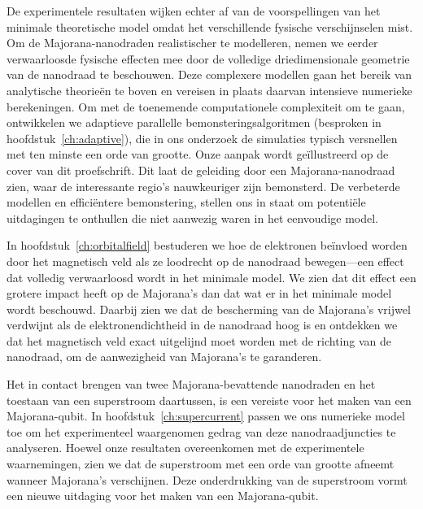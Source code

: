 {
De experimentele resultaten wijken echter af van de voorspellingen van het minimale theoretische model omdat het verschillende fysische verschijnselen mist.
Om de Majorana-nanodraden realistischer te modelleren, nemen we eerder verwaarloosde fysische effecten mee door de volledige driedimensionale geometrie van de nanodraad te beschouwen.
Deze complexere modellen gaan het bereik van analytische theorieën te boven en vereisen in plaats daarvan intensieve numerieke berekeningen.
Om met de toenemende computationele complexiteit om te gaan, ontwikkelen we adaptieve parallelle bemonsteringsalgoritmen (besproken in hoofdstuk~\ref{ch:adaptive}), die in ons onderzoek de simulaties typisch versnellen met ten minste een orde van grootte.
Onze aanpak wordt geïllustreerd op de cover van dit proefschrift.
Dit laat de geleiding door een Majorana-nanodraad zien, waar de interessante regio's nauwkeuriger zijn bemonsterd.  %
De verbeterde modellen en efficiëntere bemonstering, stellen ons in staat om potentiële uitdagingen te onthullen die niet aanwezig waren in het eenvoudige model.

In hoofdstuk~\ref{ch:orbitalfield} bestuderen we hoe de elektronen beïnvloed worden door het magnetisch veld als ze loodrecht op de nanodraad bewegen---een effect dat volledig verwaarloosd wordt in het minimale model.
We zien dat dit effect een grotere impact heeft op de Majorana's dan dat wat er in het minimale model wordt beschouwd.
Daarbij zien we dat de bescherming van de Majorana's vrijwel verdwijnt als de elektronendichtheid in de nanodraad hoog is en ontdekken we dat het magnetisch veld exact uitgelijnd moet worden met de richting van de nanodraad, om de aanwezigheid van Majorana's te garanderen.

Het in contact brengen van twee Majorana-bevattende nanodraden en het toestaan van een superstroom daartussen, is een vereiste voor het maken van een Majorana-qubit.
In hoofdstuk~\ref{ch:supercurrent} passen we ons numerieke model toe om het experimenteel waargenomen gedrag van deze nanodraadjuncties te analyseren.
Hoewel onze resultaten overeenkomen met de experimentele waarnemingen, zien we dat de superstroom met een orde van grootte afneemt wanneer Majorana's verschijnen.
Deze onderdrukking van de superstroom vormt een nieuwe uitdaging voor het maken van een Majorana-qubit.

}
